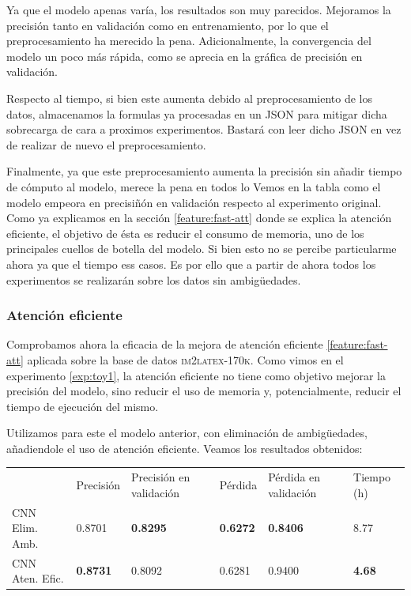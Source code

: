 \documentclass[a4paper, 20pt, dvipsnames]{article}
\begin{document}
Ya que el modelo apenas varía, los resultados son muy parecidos. Mejoramos la
precisión tanto en validación como en entrenamiento, por lo que el preprocesamiento
ha merecido la pena. Adicionalmente, la convergencia del modelo un poco más rápida,
como se aprecia en la gráfica de precisión en validación.

Respecto al tiempo, si bien este aumenta debido al preprocesamiento de los datos,
almacenamos la formulas ya procesadas en un JSON para mitigar dicha sobrecarga de
cara a proximos experimentos. Bastará con leer dicho JSON en vez de realizar de
nuevo el preprocesamiento.

Finalmente, ya que este preprocesamiento aumenta la precisión sin añadir tiempo de
cómputo al modelo, merece la pena en todos lo
Vemos en la tabla como el modelo empeora en precisiñón en validación respecto al experimento original. Como ya explicamos en la sección \ref{feature:fast-att} donde se explica la atención eficiente, el objetivo de ésta es reducir el consumo de memoria, uno de los principales cuellos de botella del modelo. Si bien esto no se percibe particularme ahora ya que el tiempo ess casos. Es por ello que a partir de
ahora todos los experimentos se realizarán sobre los datos sin ambigüedades.

\subsubsection{Atención eficiente}
\label{exp:3a}

Comprobamos ahora la eficacia de la mejora de atención eficiente
\ref{feature:fast-att} aplicada sobre la base de datos
\textsc{im2latex-170k}. Como vimos en el experimento \ref{exp:toy1}, la atención
eficiente no tiene como objetivo mejorar la precisión del modelo, sino reducir
el uso de memoria y, potencialmente, reducir el tiempo de ejecución del mismo.

Utilizamos para este el modelo anterior, con eliminación de ambigüedades,
añadiendole el uso de atención eficiente. Veamos los resultados obtenidos:

\begin{table}[H]
	\centering
	\begin{tabular}{llllll}
		& Precisión       & Precisión en validación & Pérdida         & Pérdida en validación & Tiempo (h)    \\ \cline{2-6} 
		CNN Elim. Amb.  & 0.8701          & \textbf{0.8295}         & \textbf{0.6272} & \textbf{0.8406}       & 8.77          \\
		CNN Aten. Efic. & \textbf{0.8731} & 0.8092                  & 0.6281          & 0.9400                & \textbf{4.68}
	\end{tabular}
\end{table}
\end{document}
